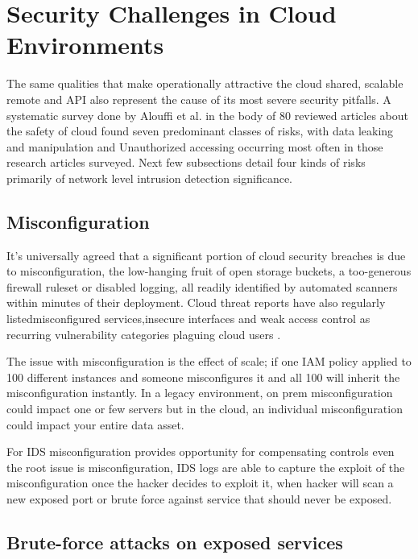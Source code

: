\section{Security Challenges in Cloud Environments}
\label{sec:cloud_security}

The same qualities that make operationally attractive the cloud shared, scalable remote and API also represent the cause of its most severe security pitfalls. A systematic survey done by Alouffi et al. \cite{alouffi2021systematic} in the body of 80 reviewed articles about the safety of cloud found seven predominant classes of risks, with data leaking and manipulation and Unauthorized accessing occurring most often in those research articles surveyed. Next few subsections detail four kinds of risks primarily of network level intrusion detection significance.

\subsection{Misconfiguration}
It’s universally agreed that a significant portion of cloud security breaches is due to misconfiguration, the low-hanging fruit of open storage buckets, a too-generous firewall ruleset or disabled logging, all readily identified by automated scanners within minutes of their deployment. Cloud threat reports have also regularly listedmisconfigured services,insecure interfaces and weak access control as recurring vulnerability categories plaguing cloud users \cite{tabrizchi2020survey}.

The issue with misconfiguration is the effect of scale; if one IAM policy applied to 100 different instances and someone misconfigures it and all 100 will inherit the misconfiguration instantly. In a legacy environment, on prem misconfiguration could impact one or few servers but in the cloud, an individual misconfiguration could impact your entire data asset.

For IDS misconfiguration provides opportunity for compensating controls even the root issue is misconfiguration, IDS logs are able to capture the exploit of the misconfiguration once the hacker decides to exploit it, when hacker will scan a new exposed port or brute force against service that should never be exposed.

\subsection{Brute-force attacks on exposed services}

